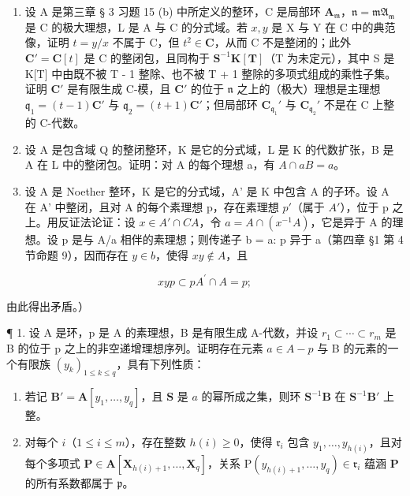 \begin{enumerate}
\def\labelenumi{\arabic{enumi}.}
\setcounter{enumi}{19}
\item
  设 A 是第三章 § 3 习题 15 (b) 中所定义的整环，C 是局部环 \(\mathbf{A}_{\mathfrak{m}}\)，\(\mathfrak{n} = \mathfrak{mA}_{\mathfrak{m}}\) 是 C 的极大理想，L 是 A 与 C 的分式域。若 \(x, y\) 是 X 与 Y 在 C 中的典范像，证明 \(t = y / x\) 不属于 C，但 \(t^2 \in \mathbf{C}\)，从而 C 不是整闭的；此外 \(\mathbf{C}' = \mathbf{C}[t]\) 是 C 的整闭包，且同构于 \(\mathbf{S}^{-1}\mathbf{K}[\mathbf{T}]\)（T 为未定元），其中 S 是 K{[}T{]} 中由既不被 T - 1 整除、也不被 T + 1 整除的多项式组成的乘性子集。证明 \(\mathbf{C}'\) 是有限生成 C-模，且 \(\mathbf{C}'\) 的位于 \(\mathfrak{n}\) 之上的（极大）理想是主理想 \(\mathfrak{q}_1 = (t - 1)\mathbf{C}'\) 与 \(\mathfrak{q}_2 = (t + 1)\mathbf{C}'\)；但局部环 \(\mathbf{C}_{\mathfrak{q}_1}'\) 与 \(\mathbf{C}_{\mathfrak{q}_2}'\) 不是在 C 上整的 C-代数。
\item
  设 A 是包含域 Q 的整闭整环，K 是它的分式域，L 是 K 的代数扩张，B 是 A 在 L 中的整闭包。证明：对 A 的每个理想 a，有 \(A \cap aB = a\)。
\item
  设 A 是 Noether 整环，K 是它的分式域，A' 是 K 中包含 A 的子环。设 A 在 A' 中整闭，且对 A 的每个素理想 p，存在素理想 \(p'\)（属于 \(A'\)），位于 p 之上。用反证法论证：设 \(x \in A' \cap C A\)，令 \(a = A \cap (x^{-1} A)\)，它是异于 A 的理想。设 p 是与 A/a 相伴的素理想；则传递子 b = a: p 异于 a（第四章 §1 第 4 节命题 9），因而存在 \(y \in b\)，使得 \(xy \notin A\)，且
\end{enumerate}

\[
x y p \subset p A ^ {\prime} \cap A = p;
\]

由此得出矛盾。）


¶ 1. 设 A 是环，p 是 A 的素理想，B 是有限生成 A-代数，并设 \(r_{1} \subset \cdots \subset r_{m}\) 是 B 的位于 p 之上的非空递增理想序列。证明存在元素 \(a \in A - p\) 与 B 的元素的一个有限族 \((y_{k})_{1 \leqslant k \leqslant q}\)，具有下列性质：

\begin{enumerate}
\def\labelenumi{(\arabic{enumi})}
\item
  若记 \(\mathbf{B}' = \mathbf{A}[y_1, \ldots, y_q]\)，且 \(\mathbf{S}\) 是 \(a\) 的幂所成之集，则环 \(\mathbf{S}^{-1}\mathbf{B}\) 在 \(\mathbf{S}^{-1}\mathbf{B}'\) 上整。
\item
  对每个 \(i\)（\(1 \leqslant i \leqslant m\)），存在整数 \(h(i) \geqslant 0\)，使得 \(\mathfrak{r}_i\) 包含 \(y_1, \ldots, y_{h(i)}\)，且对每个多项式 \(\mathbf{P} \in \mathbf{A}[\mathbf{X}_{h(i)+1}, \ldots, \mathbf{X}_q]\)，关系 \(\mathrm{P}(y_{h(i)+1}, \ldots, y_q) \in \mathfrak{r}_i\) 蕴涵 \(\mathbf{P}\) 的所有系数都属于 \(\mathfrak{p}\)。
\end{enumerate}

